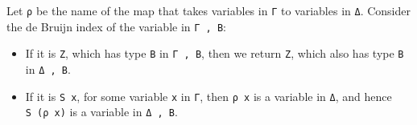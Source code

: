 \begin{fence}
\begin{code}%
\>[0]\AgdaSpace{}%
\AgdaSymbol{:}\AgdaSpace{}%
\AgdaSpace{}%
\AgdaSymbol{\{}\AgdaSpace{}%
\AgdaSymbol{\}}\<%
\\
\>[0][@{}l@{\AgdaIndent{0}}]%
\>[2]%
\>[612I]\AgdaSpace{}%
\AgdaSymbol{\{}\AgdaSymbol{\}}\AgdaSpace{}%
%
\>[19]\AgdaSpace{}%
\AgdaSpace{}%
\AgdaSpace{}%
%
\>[31]\AgdaSpace{}%
\AgdaSpace{}%
\AgdaSymbol{)}\<%
\\
\>[.][@{}l@{}]\<[612I]%
\>[4]\AgdaComment{---------------------------------}\<%
\\
%
\>[2]\AgdaSpace{}%
\AgdaSpace{}%
\AgdaSymbol{\{}\AgdaSpace{}%
\AgdaSymbol{\}}\AgdaSpace{}%
\AgdaSpace{}%
\AgdaSpace{}%
\AgdaOperator{\AgdaInductiveConstructor{,}}\AgdaSpace{}%
\AgdaSpace{}%
\AgdaSpace{}%
\AgdaSpace{}%
\AgdaSpace{}%
\AgdaSpace{}%
\AgdaOperator{\AgdaInductiveConstructor{,}}\AgdaSpace{}%
\AgdaSpace{}%
\AgdaSpace{}%
\AgdaSymbol{)}\<%
\\
\>[0]\AgdaSpace{}%
\AgdaSpace{}%
%
\>[13]\AgdaSymbol{=}%
\>[16]\<%
\\
\>[0]\AgdaSpace{}%
\AgdaSpace{}%
\AgdaSymbol{(}\AgdaSpace{}%
\AgdaSymbol{)}%
\>[13]\AgdaSymbol{=}%
\>[16]\AgdaSpace{}%
\AgdaSymbol{(}\AgdaSpace{}%
\AgdaSymbol{)}\<%
\end{code}
\end{fence}

Let \texttt{ρ} be the name of the map that takes variables in \texttt{Γ}
to variables in \texttt{Δ}. Consider the de Bruijn index of the variable
in \texttt{Γ\ ,\ B}:

\begin{itemize}
\item
  If it is \texttt{Z}, which has type \texttt{B} in \texttt{Γ\ ,\ B},
  then we return \texttt{Z}, which also has type \texttt{B} in
  \texttt{Δ\ ,\ B}.
\item
  If it is \texttt{S\ x}, for some variable \texttt{x} in \texttt{Γ},
  then \texttt{ρ\ x} is a variable in \texttt{Δ}, and hence
  \texttt{S\ (ρ\ x)} is a variable in \texttt{Δ\ ,\ B}.
\end{itemize}

